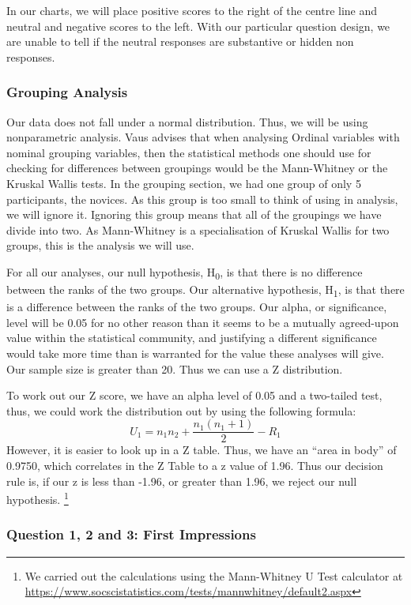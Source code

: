 In our charts, we will place positive scores to the right of the centre line and neutral and negative scores to the left.
With our particular question design, we are unable to tell if the neutral responses are substantive or hidden non responses\cite{blasius2001use}.

\subsubsection{Grouping Analysis}
Our data does not fall under a normal distribution. 
Thus, we will be using nonparametric analysis.
Vaus\cite{de2013surveys} advises that when analysing Ordinal variables with nominal grouping variables, then the statistical methods one should use for checking for differences between groupings would be the Mann-Whitney\cite{mann1947test} or the Kruskal Wallis\cite{kruskal1952use} tests.
In the grouping section, we had one group of only 5 participants, the novices.
As this group is too small to think of using in analysis, we will ignore it.
Ignoring this group means that all of the groupings we have divide into two.
As Mann-Whitney is a specialisation of Kruskal Wallis for two groups, this is the analysis we will use.

For all our analyses, our null hypothesis, H\textsubscript{0}, is that there is no difference between the ranks of the two groups. 
Our alternative hypothesis, H\textsubscript{1}, is that there is a difference between the ranks of the two groups.
Our alpha, or significance, level will be 0.05 for no other reason than it seems to be a mutually agreed-upon value within the statistical community, and justifying a different significance would take more time than is warranted for the value these analyses will give.
Our sample size is greater than 20. 
Thus we can use a Z distribution.

To work out our Z score, we have an alpha level of 0.05 and a two-tailed test, thus, we could work the distribution out by using the following formula:
\[U_{1}=n_{1}n_{2}+\frac{n_{1}(n_{1}+1)}{2}-R_{1}\]
However, it is easier to look up in a Z table.
Thus, we have an ``area in body'' of 0.9750, which correlates in the Z Table to a z value of 1.96.
Thus our decision rule is, if our z is less than -1.96, or greater than 1.96, we reject our null hypothesis.
\footnote{We carried out the calculations using the Mann-Whitney U Test calculator at \url{https://www.socscistatistics.com/tests/mannwhitney/default2.aspx}}

\pagebreak
\subsubsection{Question 1, 2 and 3: First Impressions}

